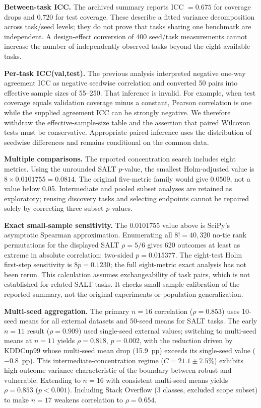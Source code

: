 \documentclass[accepted]{uai2026} %
\begin{document}
\textbf{Between-task ICC.} The archived summary reports ICC $=0.675$ for coverage drops and $0.720$ for test coverage. These describe a fitted variance decomposition across task/seed levels; they do not prove that tasks sharing one benchmark are independent. A design-effect conversion of 400 seed/task measurements cannot increase the number of independently observed tasks beyond the eight available tasks.

\textbf{Per-task ICC(val,test).} The previous analysis interpreted negative one-way agreement ICC as negative seedwise correlation and converted 50 pairs into effective sample sizes of 55--250. That inference is invalid. For example, when test coverage equals validation coverage minus a constant, Pearson correlation is one while the supplied agreement ICC can be strongly negative. We therefore withdraw the effective-sample-size table and the assertion that paired Wilcoxon tests must be conservative. Appropriate paired inference uses the distribution of seedwise differences and remains conditional on the common data.



\textbf{Multiple comparisons.} The reported concentration search includes eight metrics. Using the unrounded SALT $p$-value, the smallest Holm-adjusted value is $8\times0.0101755=0.0814$. The original five-metric family would give $0.0509$, not a value below 0.05. Intermediate and pooled subset analyses are retained as exploratory; reusing discovery tasks and selecting endpoints cannot be repaired solely by correcting three subset $p$-values.

\textbf{Exact small-sample sensitivity.} The $0.0101755$ value above is SciPy's asymptotic Spearman approximation. Enumerating all $8!=40{,}320$ no-tie rank permutations for the displayed SALT $\rho=5/6$ gives 620 outcomes at least as extreme in absolute correlation: two-sided $p=0.015377$. The eight-test Holm first-step sensitivity is $8p=0.1230$; the full eight-metric exact analysis has not been rerun. This calculation assumes exchangeability of task pairs, which is not established for related SALT tasks. It checks small-sample calibration of the reported summary, not the original experiments or population generalization.

\textbf{Multi-seed aggregation.} The primary $n=16$ correlation ($\rho = 0.853$) uses 10-seed means for all external datasets and 50-seed means for SALT tasks. The early $n=11$ result ($\rho = 0.909$) used single-seed external values; switching to multi-seed means at $n=11$ yields $\rho = 0.818$, $p = 0.002$, with the reduction driven by KDDCup99 whose multi-seed mean drop (15.9~pp) exceeds its single-seed value ($-$0.8~pp). This intermediate-concentration regime ($C=21.1\pm7.5\%$) exhibits high outcome variance characteristic of the boundary between robust and vulnerable. Extending to $n=16$ with consistent multi-seed means yields $\rho = 0.853$ ($p < 0.001$). Including Stack Overflow (3 classes, excluded scope subset) to make $n=17$ weakens correlation to $\rho = 0.654$.
\end{document}

